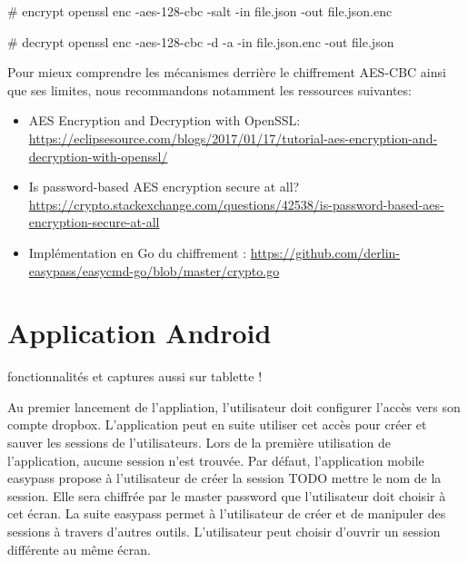 \begin{bashcode}
# encrypt
openssl enc -aes-128-cbc -salt -in file.json -out file.json.enc  

# decrypt
openssl enc -aes-128-cbc -d -a -in file.json.enc -out file.json 
\end{bashcode}


Pour mieux comprendre les mécanismes derrière le chiffrement AES-CBC ainsi que ses limites, nous recommandons notamment les ressources suivantes:

\begin{itemize}
    \item AES Encryption and Decryption with OpenSSL: \url{https://eclipsesource.com/blogs/2017/01/17/tutorial-aes-encryption-and-decryption-with-openssl/}
    \item Is password-based AES encryption secure at all? \url{https://crypto.stackexchange.com/questions/42538/is-password-based-aes-encryption-secure-at-all}
    \item Implémentation en Go du chiffrement \easypass{}: \url{https://github.com/derlin-easypass/easycmd-go/blob/master/crypto.go}
\end{itemize}

\section{Application Android}

fonctionnalités et captures aussi sur tablette !

Au premier lancement de l'appliation, l'utilisateur doit configurer l'accès vers son compte dropbox. L'application peut en suite utiliser cet accès pour créer et sauver les sessions de l'utilisateurs. Lors de la première utilisation de l'application, aucune session n'est trouvée. Par défaut, l'application mobile easypass propose à l'utilisateur de créer la session TODO mettre le nom de la session. Elle sera chiffrée par le master password que l'utilisateur doit choisir à cet écran. La suite easypass permet à l'utilisateur de créer et de manipuler des sessions à travers d'autres outils. L'utilisateur peut choisir d'ouvrir un session  différente au même écran.


